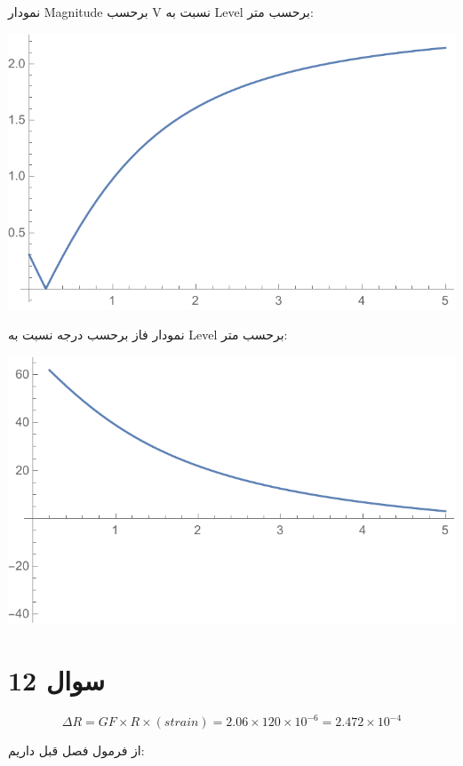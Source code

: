 \documentclass[12pt]{article}
\begin{document}
نمودار Magnitude برحسب V نسبت به Level برحسب متر:


\begin{center}
	\includegraphics[width = 1.0 \textwidth]{images/3.pdf}
\end{center}

نمودار فاز برحسب درجه نسبت به Level برحسب متر:

\begin{center}
	\includegraphics[width = 1.0 \textwidth]{images/4.pdf}
\end{center}

\newpage

\section*{سوال 12}

$$\Delta R = GF \times R \times (strain) = 2.06 \times 120 \times 10^{-6} = 2.472 \times 10^{-4}$$

از فرمول فصل قبل داریم:
\end{document}
